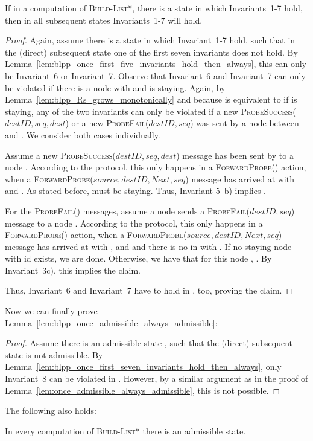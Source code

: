 \documentclass[a4paper,USenglish]{lipics}
\newcommand{\blpp}{\textsc{Build-List*}\xspace}
\newcommand{\forwardprobe}[1]{\textsc{ForwardProbe(\ensuremath{#1})}\xspace}
\newcommand{\psuccess}[1]{\textsc{ProbeSuccess(\ensuremath{#1})}\xspace}
\newcommand{\pfail}[1]{\textsc{ProbeFail(\ensuremath{#1})}\xspace}
\begin{document}
\begin{lemma}\label{lem:blpp_once_first_seven_invariants_hold_then_always}
 If in a computation of \blpp, there is a state in which Invariants~1-7 hold, then in all subsequent states Invariants~1-7 will hold.
\end{lemma}
\begin{proof}
  Again, assume there is a state  in which Invariant~1-7 hold, such that in the (direct) subsequent state  one of the first seven invariants does not hold.
 By Lemma~\ref{lem:blpp_once_first_five_invariants_hold_then_always}, this can only be Invariant~6 or Invariant~7.
 Observe that Invariant~6 and Invariant~7 can only be violated if there is a node  with  and  is staying.
 Again, by Lemma~\ref{lem:blpp_Rs_grows_monotonically} and because  is equivalent to  if  is staying, any of the two invariants can only be violated if a new \psuccess{destID,seq,dest} or a new \pfail{destID,seq} was sent by a node  between  and .
 We consider both cases individually.
 
 Assume a new \psuccess{destID,seq,dest} message has been sent by  to a node .
 	According to the protocol, this only happens in a \forwardprobe{} action, when a \forwardprobe{source,destID,Next,seq} message has arrived at  with  and .
 	As stated before,  must be staying.
	Thus, Invariant 5~b) implies .
	
	For the \pfail{} messages, assume a node  sends a \pfail{destID, seq} message to a node .
	According to the protocol, this only happens in a \forwardprobe{} action, when a \forwardprobe{source,destID,Next,seq} message has arrived at  with ,  and  and there is no  in  with .
	If no staying node with id  exists, we are done.
	Otherwise, we have that for this node , .
	By Invariant~3c), this implies the claim.

 Thus, Invariant~6 and Invariant~7 have to hold in , too, proving the claim.
\end{proof}
Now we can finally prove Lemma~\ref{lem:blpp_once_admissible_always_admissible}:
\begin{proof}
 Assume there is an admissible state , such that the (direct) subsequent state  is not admissible.
 By Lemma~\ref{lem:blpp_once_first_seven_invariants_hold_then_always}, only Invariant~8 can be violated in .
 However, by a similar argument as in the proof of Lemma~\ref{lem:once_admissible_always_admissible}, this is not possible.
\end{proof}
The following also holds:
\begin{lemma}\label{lem:blpp_admissible_state_always_exists}
 In every computation of \blpp there is an admissible state.
\end{lemma}
\end{document}

